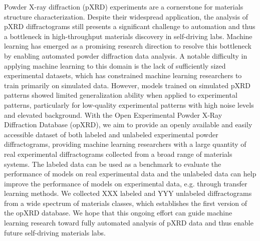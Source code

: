 Powder X-ray diffraction (pXRD) experiments are a cornerstone for materials structure characterization.
Despite their widespread application, the analysis of pXRD diffractograms still presents a significant challenge to automation and thus a bottleneck in high-throughput materials discovery in self-driving labs.
Machine learning has emerged as a promising research direction to resolve this bottleneck by enabling automated powder diffraction data analysis.
A notable difficulty in applying machine learning to this domain is the lack of sufficiently sized experimental datasets, which has constrained machine learning researchers to train primarily on simulated data. However, models trained on simulated pXRD patterns showed limited generalization ability when applied to experimental patterns, particularly for low-quality experimental patterns with high noise levels and elevated background.
With the Open Experimental Powder X-Ray Diffraction Database (opXRD), we aim to provide an openly available and easily accessible dataset of both labeled and unlabeled experimental powder diffractograms, providing machine learning researchers with a large quantity of real experimental diffractograms collected from a broad range of materials systems. The labeled data can be used as a benchmark to evaluate the performance of models on real experimental data and the unlabeled data can help improve the performance of models on experimental data, e.g. through transfer learning methods.
We collected XXX labeled and YYY unlabeled diffractograms from a wide spectrum of materials classes, which establishes the first version of the opXRD database.
We hope that this ongoing effort can guide machine learning research toward fully automated analysis of pXRD data and thus enable future self-driving materials labs.